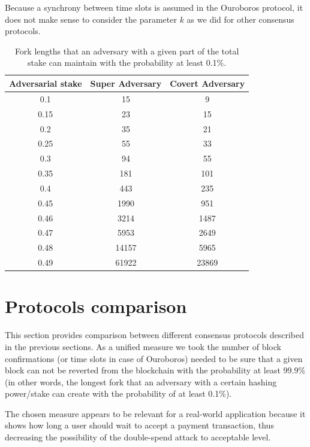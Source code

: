 \documentclass[10pt,a4paper]{article}
\numberwithin{equation}{section} %
\theoremstyle{plain}
\theoremstyle{definition}
\theoremstyle{remark}
\begin{document}
    Because a synchrony between time slots is assumed in the Ouroboros protocol, it does not make sense to consider the parameter \(k\) as we did for other consensus protocols.
    \begin{table}[h!]
        \label{tbl:ouroboros_fork_lengths}
        \centering
    \begin{tabular}{ | c || c | c | }
         \hline 
         Adversarial stake & Super Adversary & Covert Adversary \\
         \hline
         0.1   & 15  & 9   \\
         0.15  & 23  & 15  \\
         0.2   & 35  & 21  \\
         0.25  & 55  & 33  \\
         0.3   & 94  & 55  \\
         0.35  & 181 & 101 \\
         0.4   & 443 & 235 \\
         0.45  & 1990  & 951 \\
         0.46  & 3214  & 1487 \\
         0.47  & 5953  & 2649 \\
         0.48  & 14157  & 5965 \\
         0.49  & 61922  & 23869 \\
         \hline
    \end{tabular}
    \caption{Fork lengths that an adversary with a given part of the total stake can maintain with the probability at least 0.1\%.}
    \end{table}
	
	\section{Protocols comparison}
	
	This section provides comparison between different consensus protocols described in the previous sections. As a unified measure we took the number of block confirmations (or time slots in case of Ouroboros) needed to be sure that a given block can not be reverted from the blockchain with the probability at least 99.9\% (in other words, the longest fork that an adversary with a certain hashing power/stake can create with the probability of at least 0.1\%). 
	
	The chosen measure appears to be relevant for a real-world application because it shows how long a user should wait to accept a payment transaction, thus decreasing the possibility of the double-spend attack to acceptable level.
	
\end{document}
